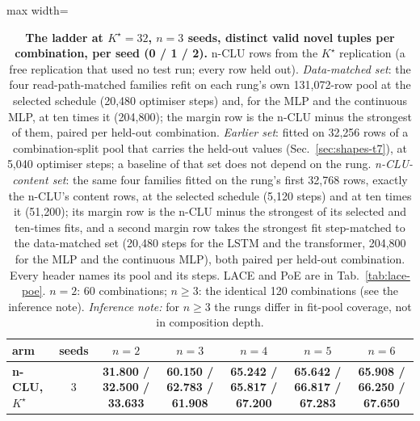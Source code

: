 \documentclass{article} %
\newcommand{\Kstar}{\ensuremath{K^{\star}}}
\begin{document}
\begin{table}[t]
\centering\small
\caption{\textbf{The ladder at $\Kstar=32$, $n=3$ seeds, distinct valid novel tuples per %
combination, per seed (0 / 1 / 2).} n-CLU rows from the $\Kstar$ replication (a free replication that
used no test run; every row held out). \emph{Data-matched set}: the four read-path-matched families %
refit on each rung's own 131,072-row pool at the selected schedule (20,480 optimiser steps) and, for %
the MLP and the continuous MLP, at ten times it (204,800); the margin row is the n-CLU minus the %
strongest of them, paired per held-out combination. \emph{Earlier set}: fitted on 32,256 rows of a %
combination-split pool that carries the held-out values (Sec.~\ref{sec:shapes-t7}), at 5,040 optimiser %
steps; a baseline of that set does not depend on the rung. \emph{n-CLU-content set}: the same four
families fitted on the rung's first 32,768 rows, exactly the n-CLU's content rows, at the selected %
schedule (5,120 steps) and at ten times it (51,200); its margin row is the n-CLU minus the strongest %
of its selected and ten-times fits, and a second margin row takes the strongest fit step-matched to the
data-matched set (20,480 steps for the LSTM and the transformer, 204,800 for the MLP and the %
continuous MLP), both paired per held-out combination. Every header names its pool and its steps. LACE
and PoE are in Tab.~\ref{tab:lace-poe}. $n=2$: 60 combinations; $n\ge3$: the identical %
120 combinations (see the inference note). \emph{Inference note:} for $n\ge3$ the rungs differ in %
fit-pool coverage, not in composition depth.}
\label{tab:ladder}
\setlength{\tabcolsep}{2.6pt}
\begin{adjustbox}{max width=\linewidth}\begin{tabular}{lcccccc}
\toprule
arm & seeds & $n=2$ & $n=3$ & $n=4$ & $n=5$ & $n=6$ \\
\midrule
\textbf{n-CLU, $\Kstar$} & 3 & \textbf{31.800 / 32.500 / 33.633} & \textbf{60.150 / 62.783 / 61.908} & \textbf{65.242 / 65.817 / 67.200} & \textbf{65.642 / 66.817 / 67.283} & \textbf{65.908 / 66.250 / 67.650} \\

\end{tabular}
\end{adjustbox}
\end{table}
\end{document}

